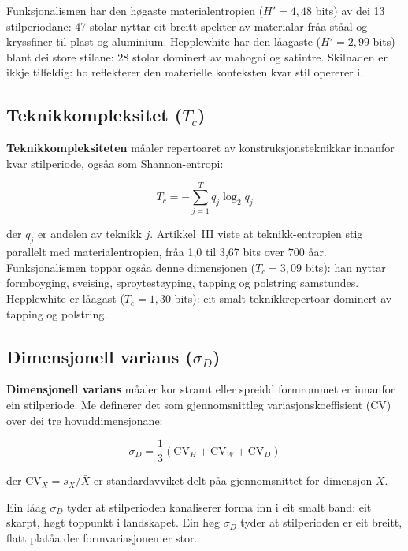 \documentclass[10pt, a4paper, twocolumn]{article}
\begin{document}
Funksjonalismen har den h\o gaste materialentropien ($H' = 4{,}48$ bits) av dei 13 stilperiodane: 47 stolar nyttar eit breitt spekter av materialar fr\r{a}a st\r{a}al og kryssfiner til plast og aluminium. Hepplewhite har den l\r{a}agaste ($H' = 2{,}99$ bits) blant dei store stilane: 28 stolar dominert av mahogni og satintre. Skilnaden er ikkje tilfeldig: ho reflekterer den materielle konteksten kvar stil opererer i.


\subsection{Teknikkompleksitet ($T_c$)}

\textbf{Teknikkompleksiteten} m\r{a}aler repertoaret av konstruksjonsteknikkar innanfor kvar stilperiode, ogs\r{a}a som Shannon-entropi:

\begin{equation}
  T_c = -\sum_{j=1}^{T} q_j \log_2 q_j
\end{equation}

\noindent der $q_j$ er andelen av teknikk $j$. Artikkel~III viste at teknikk-entropien stig parallelt med materialentropien, fr\r{a}a 1{,}0 til 3{,}67 bits over 700 \r{a}ar. Funksjonalismen toppar ogs\r{a}a denne dimensjonen ($T_c = 3{,}09$ bits): han nyttar formboyging, sveising, sproytest\o yping, tapping og polstring samstundes. Hepplewhite er l\r{a}agast ($T_c = 1{,}30$ bits): eit smalt teknikkrepertoar dominert av tapping og polstring.


\subsection{Dimensjonell varians ($\sigma_D$)}

\textbf{Dimensjonell varians} m\r{a}aler kor stramt eller spreidd formrommet er innanfor ein stilperiode. Me definerer det som gjennomsnittleg variasjonskoeffisient (CV) over dei tre hovuddimensjonane:

\begin{equation}
  \sigma_D = \frac{1}{3}\left(\text{CV}_H + \text{CV}_W + \text{CV}_D\right)
\end{equation}

\noindent der $\text{CV}_X = s_X / \bar{X}$ er standardavviket delt p\r{a}a gjennomsnittet for dimensjon $X$.

Ein l\r{a}ag $\sigma_D$ tyder at stilperioden kanaliserer forma inn i eit smalt band: eit skarpt, h\o gt toppunkt i landskapet. Ein h\o g $\sigma_D$ tyder at stilperioden er eit breitt, flatt plat\r{a}a der formvariasjonen er stor.
\end{document}
